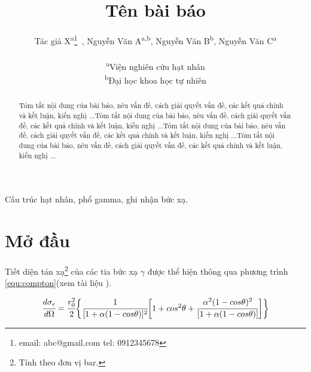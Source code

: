 \documentclass[11pt, bold, center]{journal}
\begin{document}
\title{Tên bài báo}

\author{Tác giả X\textsuperscript{a}\thanks{email: abc@gmail.com \newline tel: 0912345678}~, 
Nguyễn Văn A\textsuperscript{a,b}, 
Nguyễn Văn B\textsuperscript{b}, 
Nguyễn Văn C\textsuperscript{a}\\
\\
\textsuperscript{a}Viện nghiên cứu hạt nhân\\
\textsuperscript{b}Đại học khoa học tự nhiên
}


\maketitle




\begin{abstract}
Tóm tắt nội dung của bài báo, nêu vấn đề, cách giải quyết vấn đề, các kết quả chính và kết luận, kiến nghị ...Tóm tắt nội dung của bài báo, nêu vấn đề, cách giải quyết vấn đề, các kết quả chính và kết luận, kiến nghị ...Tóm tắt nội dung của bài báo, nêu vấn đề, cách giải quyết vấn đề, các kết quả chính và kết luận, kiến nghị ...Tóm tắt nội dung của bài báo, nêu vấn đề, cách giải quyết vấn đề, các kết quả chính và kết luận, kiến nghị ...
\end{abstract}

\begin{keywords}
Cấu trúc hạt nhân, phổ gamma, ghi nhận bức xạ.
\end{keywords}



\section{Mở đầu}

Tiết diện tán xạ\footnote{Tính theo đơn vị bar.} của các tia bức xạ $\gamma$ được thể hiện thông qua phương trình \ref{equ:compton}(xem tài liệu \cite{bib_Klein, bib_Knoll}).  




\begin{equation}
\cfrac{d \sigma_{e}}{d \Omega} = \cfrac{r_{0}^{2}}{2} 
\biggl\{
\cfrac{1}{[1+\alpha(1-cos\theta)]^{2}}
\biggl [
1+cos^{2}\theta+\cfrac{\alpha^{2}(1-cos\theta)^{2}}{[1+\alpha(1-cos\theta)]}
\biggr ]
\biggr\}
\label{equ:compton}
\end{equation}
\end{document}
